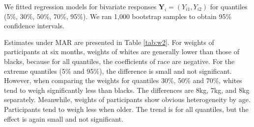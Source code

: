 \documentclass[12pt]{article}
\begin{document}
We fitted regression models for bivariate responses $\bm Y_i =
(Y_{i1}, Y_{i2})$ for quantiles (5\%, 30\%, 50\%, 70\%, 95\%).  We ran
1,000 bootstrap samples to obtain 95\% confidence intervals.

Estimates under MAR are presented in Table \ref{tab:w2}. For weights
of participants at six months, weights of whites are generally lower
than those of blacks, because for all quantiles, the coefficients of
race are negative. For the extreme quantiles (5\% and 95\%), the
difference is small and not significant. However, when comparing the
weights for quantiles 30\%, 50\% and 70\%, whites tend to weigh
significantly less than blacks. The differences are 8kg, 7kg, and 8kg
separately. Meanwhile, weights of participants show obvious
heterogeneity by age. Participants tend to weigh less when older. The
trend is for all quantiles, but the effect is again small and not
significant.
\end{document}
